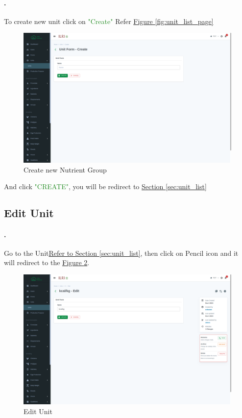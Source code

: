 \paragraph{.}To create new unit click on \textcolor{ForestGreen}{"Create"} Refer \hyperref[fig:unit_list_page]{Figure \ref{fig:unit_list_page}}
\begin{figure}[h!]
  	\includegraphics[width=15cm]{screenshots/unit_create_page.png}
  	\caption{Create new Nutrient Group}
  	\label{fig:unit_create_page}
\end{figure}
And click \textcolor{ForestGreen}{"CREATE"}, you will be redirect to  \hyperref[sec:unit_list]{Section \ref{sec:unit_list}}

\subsection{Edit Unit}\label{sec:unit_edit}
\setcounter{stepcounter}{1}
\paragraph{.}Go to the Unit\hyperref[sec:unit_list]{Refer to Section \ref{sec:unit_list}}, then click on Pencil icon and it will redirect to the \hyperref[fig:unit_edit_page]{Figure \ref{fig:unit_edit_page}}.
\begin{figure}[h!]
  	\includegraphics[width=15cm]{screenshots/unit_edit_page.png}
  	\caption{Edit Unit}
  	\label{fig:unit_edit_page}
\end{figure}

